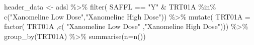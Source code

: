 \documentclass[
  letterpaper,
  DIV=11,
  numbers=noendperiod]{scrreprt}
\newenvironment{Shaded}{\begin{snugshade}}{\end{snugshade}}
\newcommand{\AttributeTok}[1]{\textcolor[rgb]{0.40,0.45,0.13}{#1}}
\newcommand{\FunctionTok}[1]{\textcolor[rgb]{0.28,0.35,0.67}{#1}}
\newcommand{\NormalTok}[1]{\textcolor[rgb]{0.00,0.23,0.31}{#1}}
\newcommand{\OtherTok}[1]{\textcolor[rgb]{0.00,0.23,0.31}{#1}}
\newcommand{\SpecialCharTok}[1]{\textcolor[rgb]{0.37,0.37,0.37}{#1}}
\newcommand{\StringTok}[1]{\textcolor[rgb]{0.13,0.47,0.30}{#1}}
\begin{document}
\begin{Shaded}
\begin{Highlighting}[]
\NormalTok{header\_data }\OtherTok{\textless{}{-}}\NormalTok{ adsl }\SpecialCharTok{\%\textgreater{}\%}
  \FunctionTok{filter}\NormalTok{(}
\NormalTok{    SAFFL }\SpecialCharTok{==} \StringTok{"Y"} \SpecialCharTok{\&} 
\NormalTok{    TRT01A }\SpecialCharTok{\%in\%} \FunctionTok{c}\NormalTok{(}\StringTok{"Xanomeline Low Dose"}\NormalTok{,}\StringTok{"Xanomeline High Dose"}\NormalTok{)) }\SpecialCharTok{\%\textgreater{}\%}
  \FunctionTok{mutate}\NormalTok{(}
    \AttributeTok{TRT01A =} \FunctionTok{factor}\NormalTok{( TRT01A}
\NormalTok{                    ,}\FunctionTok{c}\NormalTok{( }\StringTok{"Xanomeline Low Dose"}
\NormalTok{                       ,}\StringTok{"Xanomeline High Dose"}\NormalTok{))) }\SpecialCharTok{\%\textgreater{}\%}
  \FunctionTok{group\_by}\NormalTok{(TRT01A) }\SpecialCharTok{\%\textgreater{}\%}
  \FunctionTok{summarise}\NormalTok{(}\AttributeTok{n=}\FunctionTok{n}\NormalTok{()) }


\end{Highlighting}
\end{Shaded}
\end{document}
